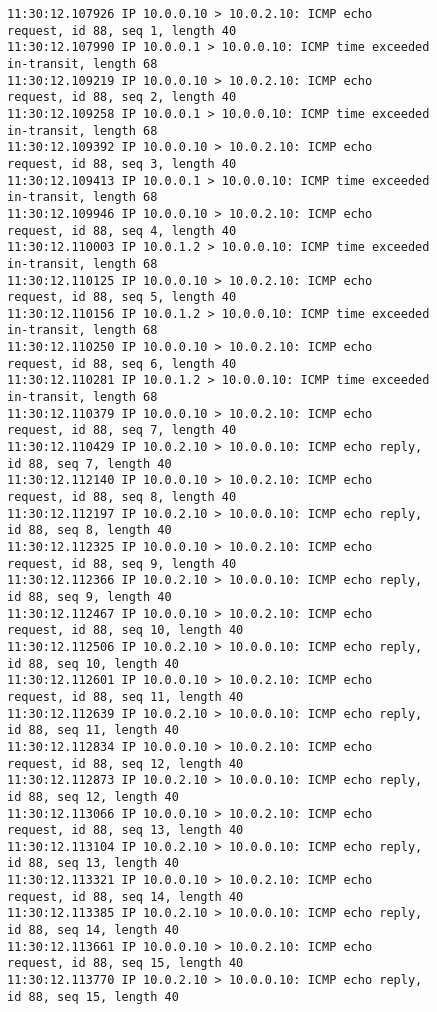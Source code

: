 \begin{figure}[ht]
  \centering
\begin{Verbatim}[fontsize=\scriptsize]
11:30:12.107926 IP 10.0.0.10 > 10.0.2.10: ICMP echo request, id 88, seq 1, length 40
11:30:12.107990 IP 10.0.0.1 > 10.0.0.10: ICMP time exceeded in-transit, length 68
11:30:12.109219 IP 10.0.0.10 > 10.0.2.10: ICMP echo request, id 88, seq 2, length 40
11:30:12.109258 IP 10.0.0.1 > 10.0.0.10: ICMP time exceeded in-transit, length 68
11:30:12.109392 IP 10.0.0.10 > 10.0.2.10: ICMP echo request, id 88, seq 3, length 40
11:30:12.109413 IP 10.0.0.1 > 10.0.0.10: ICMP time exceeded in-transit, length 68
11:30:12.109946 IP 10.0.0.10 > 10.0.2.10: ICMP echo request, id 88, seq 4, length 40
11:30:12.110003 IP 10.0.1.2 > 10.0.0.10: ICMP time exceeded in-transit, length 68
11:30:12.110125 IP 10.0.0.10 > 10.0.2.10: ICMP echo request, id 88, seq 5, length 40
11:30:12.110156 IP 10.0.1.2 > 10.0.0.10: ICMP time exceeded in-transit, length 68
11:30:12.110250 IP 10.0.0.10 > 10.0.2.10: ICMP echo request, id 88, seq 6, length 40
11:30:12.110281 IP 10.0.1.2 > 10.0.0.10: ICMP time exceeded in-transit, length 68
11:30:12.110379 IP 10.0.0.10 > 10.0.2.10: ICMP echo request, id 88, seq 7, length 40
11:30:12.110429 IP 10.0.2.10 > 10.0.0.10: ICMP echo reply, id 88, seq 7, length 40
11:30:12.112140 IP 10.0.0.10 > 10.0.2.10: ICMP echo request, id 88, seq 8, length 40
11:30:12.112197 IP 10.0.2.10 > 10.0.0.10: ICMP echo reply, id 88, seq 8, length 40
11:30:12.112325 IP 10.0.0.10 > 10.0.2.10: ICMP echo request, id 88, seq 9, length 40
11:30:12.112366 IP 10.0.2.10 > 10.0.0.10: ICMP echo reply, id 88, seq 9, length 40
11:30:12.112467 IP 10.0.0.10 > 10.0.2.10: ICMP echo request, id 88, seq 10, length 40
11:30:12.112506 IP 10.0.2.10 > 10.0.0.10: ICMP echo reply, id 88, seq 10, length 40
11:30:12.112601 IP 10.0.0.10 > 10.0.2.10: ICMP echo request, id 88, seq 11, length 40
11:30:12.112639 IP 10.0.2.10 > 10.0.0.10: ICMP echo reply, id 88, seq 11, length 40
11:30:12.112834 IP 10.0.0.10 > 10.0.2.10: ICMP echo request, id 88, seq 12, length 40
11:30:12.112873 IP 10.0.2.10 > 10.0.0.10: ICMP echo reply, id 88, seq 12, length 40
11:30:12.113066 IP 10.0.0.10 > 10.0.2.10: ICMP echo request, id 88, seq 13, length 40
11:30:12.113104 IP 10.0.2.10 > 10.0.0.10: ICMP echo reply, id 88, seq 13, length 40
11:30:12.113321 IP 10.0.0.10 > 10.0.2.10: ICMP echo request, id 88, seq 14, length 40
11:30:12.113385 IP 10.0.2.10 > 10.0.0.10: ICMP echo reply, id 88, seq 14, length 40
11:30:12.113661 IP 10.0.0.10 > 10.0.2.10: ICMP echo request, id 88, seq 15, length 40
11:30:12.113770 IP 10.0.2.10 > 10.0.0.10: ICMP echo reply, id 88, seq 15, length 40

\end{Verbatim}
\end{figure}
